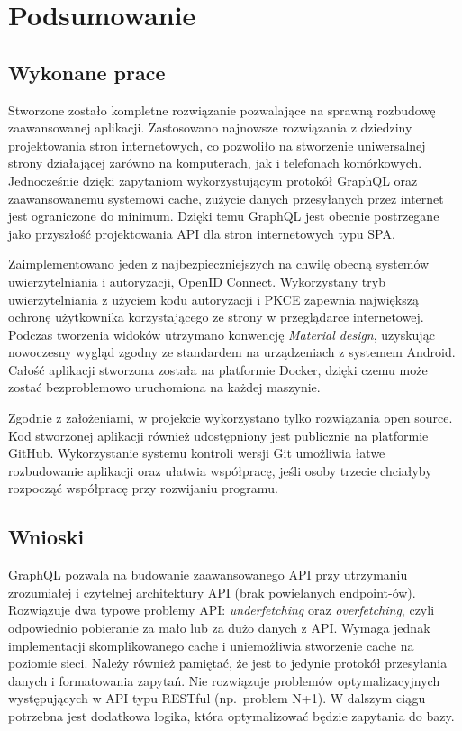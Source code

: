 \chapter{Podsumowanie}
\section{Wykonane prace}
	Stworzone zostało kompletne rozwiązanie pozwalające na sprawną rozbudowę zaawansowanej aplikacji.
	Zastosowano najnowsze rozwiązania z dziedziny projektowania stron internetowych,
	co pozwoliło na stworzenie uniwersalnej strony działającej zarówno na komputerach, jak i telefonach komórkowych.
	Jednocześnie dzięki zapytaniom wykorzystującym protokół GraphQL oraz zaawansowanemu systemowi cache, zużycie danych przesyłanych przez internet jest ograniczone do minimum.
	Dzięki temu GraphQL jest obecnie postrzegane jako przyszłość projektowania API dla stron internetowych typu SPA.

	Zaimplementowano jeden z najbezpieczniejszych na chwilę obecną systemów uwierzytelniania i autoryzacji, OpenID Connect.
	Wykorzystany tryb uwierzytelniania z użyciem kodu autoryzacji i PKCE zapewnia największą ochronę użytkownika korzystającego ze strony w przeglądarce internetowej.
	Podczas tworzenia widoków utrzymano konwencję \emph{Material design}, uzyskując nowoczesny wygląd zgodny ze standardem na urządzeniach z systemem Android.
	Całość aplikacji stworzona została na platformie Docker, dzięki czemu może zostać bezproblemowo uruchomiona na każdej maszynie. 
	
	Zgodnie z założeniami, w projekcie wykorzystano tylko rozwiązania open source.
	Kod stworzonej aplikacji również udostępniony jest publicznie na platformie GitHub.
	Wykorzystanie systemu kontroli wersji Git umożliwia łatwe rozbudowanie aplikacji oraz ułatwia współpracę,
	jeśli osoby trzecie chciałyby rozpocząć współpracę przy rozwijaniu programu.
	
\section{Wnioski}
	GraphQL pozwala na budowanie zaawansowanego API przy utrzymaniu zrozumiałej i czytelnej architektury API (brak powielanych endpoint-ów).
	Rozwiązuje dwa typowe problemy API: \emph{underfetching} oraz \emph{overfetching}, czyli odpowiednio pobieranie za mało lub za dużo danych z API.
	Wymaga jednak implementacji skomplikowanego cache i uniemożliwia stworzenie cache na poziomie sieci.
	Należy również pamiętać, że jest to jedynie protokół przesyłania danych i formatowania zapytań.
	Nie rozwiązuje problemów optymalizacyjnych występujących w API typu RESTful (np.\ problem N+1).
	W dalszym ciągu potrzebna jest dodatkowa logika, która optymalizować będzie zapytania do bazy.

